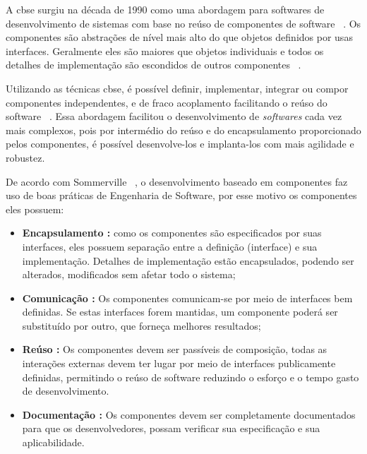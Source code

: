 A \ac{cbse} surgiu na década de 1990 como uma abordagem para softwares de desenvolvimento de sistemas com base no reúso de componentes de software ~\cite{sommerville2011}. Os componentes são abstrações de nível mais alto do que objetos definidos por usas interfaces. Geralmente eles são maiores que objetos individuais e todos os detalhes de implementação são escondidos de outros componentes ~\cite{sommerville2011}.

Utilizando as técnicas \ac{cbse}, é possível definir, implementar, integrar ou compor componentes independentes, e de fraco acoplamento facilitando o reúso do software ~\cite{bezerra2007}. Essa abordagem facilitou o desenvolvimento de \textit{softwares} cada vez mais complexos, pois por intermédio do reúso e do encapsulamento proporcionado pelos componentes, é possível desenvolve-los e implanta-los com mais agilidade e robustez.  

De acordo com Sommerville ~\cite{sommerville2011}, o desenvolvimento baseado em componentes faz uso de boas práticas de Engenharia de Software, por esse motivo os componentes eles possuem:
	\begin{itemize}
		\item \textbf{Encapsulamento :} como os componentes são especificados por suas interfaces, eles possuem separação entre a definição (interface) e sua implementação. Detalhes de implementação estão encapsulados, podendo ser alterados, modificados sem afetar todo o sistema;
		\item \textbf{Comunicação :} Os componentes comunicam-se por meio de interfaces bem definidas. Se estas interfaces forem mantidas, um componente poderá ser substituído por outro, que forneça melhores resultados;
		\item \textbf{Reúso :} Os componentes devem ser passíveis de composição, todas as interações externas devem ter lugar por meio de interfaces publicamente definidas, permitindo o reúso de software reduzindo o esforço e o tempo gasto de desenvolvimento.		
		\item \textbf{Documentação :} Os componentes devem ser completamente documentados para que os desenvolvedores, possam verificar sua especificação e sua aplicabilidade.
	\end{itemize}

